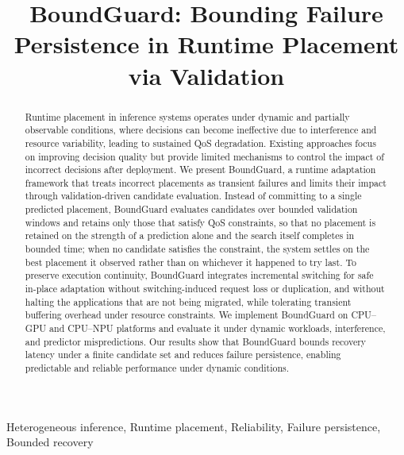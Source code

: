 \documentclass[conference]{IEEEtran}
\begin{document}
\title{BoundGuard: Bounding Failure Persistence in Runtime Placement via Validation}


\maketitle

\begin{abstract}
Runtime placement in inference systems operates under dynamic and partially observable conditions, where decisions can become ineffective due to interference and resource variability, leading to sustained QoS degradation. Existing approaches focus on improving decision quality but provide limited mechanisms to control the impact of incorrect decisions after deployment.
%
We present BoundGuard, a runtime adaptation framework that treats incorrect placements as transient failures and limits their impact through validation-driven candidate evaluation. Instead of committing to a single predicted placement, BoundGuard evaluates candidates over bounded validation windows and retains only those that satisfy QoS constraints, \textcolor{navyblue}{so that no placement is retained on the strength of a prediction alone and the search itself completes in bounded time; when no candidate satisfies the constraint, the system settles on the best placement it observed rather than on whichever it happened to try last.}
%
To preserve execution continuity, BoundGuard integrates incremental switching for safe in-place adaptation \textcolor{navyblue}{without switching-induced request loss or duplication, and without halting the applications that are not being migrated}, while tolerating transient buffering overhead under resource constraints.
%
We implement BoundGuard on CPU--GPU and CPU--NPU platforms and evaluate it under dynamic workloads, interference, and predictor mispredictions. Our results show that BoundGuard bounds recovery latency under a finite candidate set and reduces failure persistence, enabling predictable and reliable performance under dynamic conditions.
\end{abstract}

\begin{IEEEkeywords}
Heterogeneous inference, Runtime placement, Reliability, Failure persistence, Bounded recovery
\end{IEEEkeywords}
\end{document}
